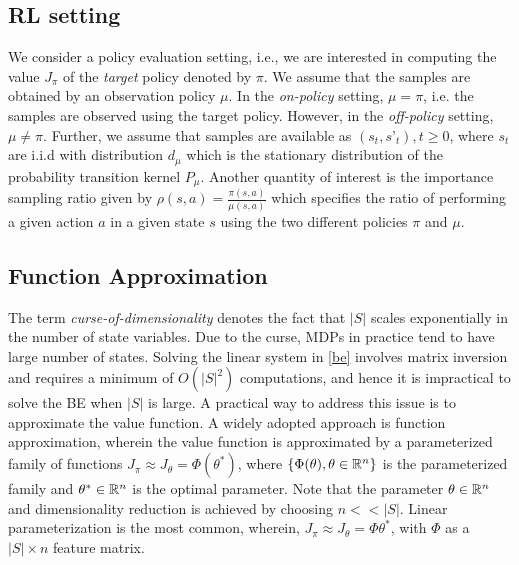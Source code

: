 \subsection{RL setting}
We consider a policy evaluation setting, i.e., we are interested in computing the value $J_\pi$ of the \emph{target} policy denoted by $\pi$. We assume that the samples are obtained by an observation policy $\mu$. In the \emph{on-policy} setting, $\mu=\pi$, i.e. the samples are observed using the target policy. However, in the \emph{off-policy} setting, $\mu\neq \pi$. Further, we assume that samples are available as $(s_t,s’_t),t\geq 0$, where $s_t$ are i.i.d with distribution $d_\mu$ which is the stationary distribution of the probability transition kernel $P_\mu$. Another quantity of interest is the importance sampling ratio given by $\rho(s,a)=\frac{\pi(s,a)}{\mu(s,a)}$ which specifies the ratio of performing a given action $a$ in a given state $s$ using the two different policies $\pi$ and $\mu$. 
\subsection{Function Approximation}
The term \emph{curse-of-dimensionality} denotes the fact that $|S|$ scales exponentially in the number of state variables. Due to the curse, MDPs in practice tend to have large number of states. Solving the linear system in \eqref{be} involves matrix inversion and requires a minimum of $O(|S|^2)$ computations, and hence it is impractical to solve the BE when $|S|$ is large. A practical way to address this issue is to approximate the value function. A widely adopted approach is function approximation, wherein the value function is approximated by a parameterized family of functions $J_\pi\approx J_\theta= \Phi(\theta^*)$, where $\{\Phi(\theta), \theta\in \mathbb{R}^n\}$ is the parameterized family and $\theta^*\in \mathbb{R}^n$ is the optimal parameter. Note that the parameter $\theta \in\mathbb{R}^n$ and dimensionality reduction is achieved by choosing $n<<|S|$. Linear parameterization is the most common, wherein, $J_\pi\approx J_\theta =\Phi\theta^*$, with $\Phi$ as a $|S|\times n$ feature matrix.
